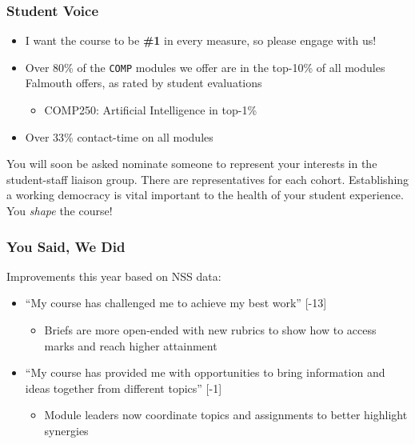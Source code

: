 \begin{frame}
	\frametitle{Student Voice}
			
	\begin{itemize}
		\item I want the course to be \textbf{\#1} in every measure, so please engage with us!
		\item Over 80\% of the \texttt{COMP} modules we offer are in the top-10\% of all modules Falmouth offers, as rated by student evaluations 
		\begin{itemize}
			\item COMP250: Artificial Intelligence in top-1\% 
		\end{itemize}	
		\item Over 33\% contact-time on all modules
	\end{itemize}
	
	\vspace{1em}
	
	You will soon be asked nominate someone to represent your interests in the student-staff liaison group. There are representatives for each cohort. 
	Establishing a working democracy is vital important to the health of your student experience. You \textit{shape} the course!
	
\end{frame}

\begin{frame}
	\frametitle{You Said, We Did}
	
	Improvements this year based on NSS data: \pause
		
	\begin{itemize}
		\item ``My course has challenged me to achieve my best work'' [-13] 
		\begin{itemize}
			\item Briefs are more open-ended with new rubrics to show how to access marks and reach higher attainment
		\end{itemize}	
		
		\pause\item ``My course has provided me with opportunities to bring information and ideas together from different topics'' [-1]
		\begin{itemize}
			\item Module leaders now coordinate topics and assignments to better highlight synergies 
		\end{itemize}	
		
	\end{itemize}
\end{frame}

